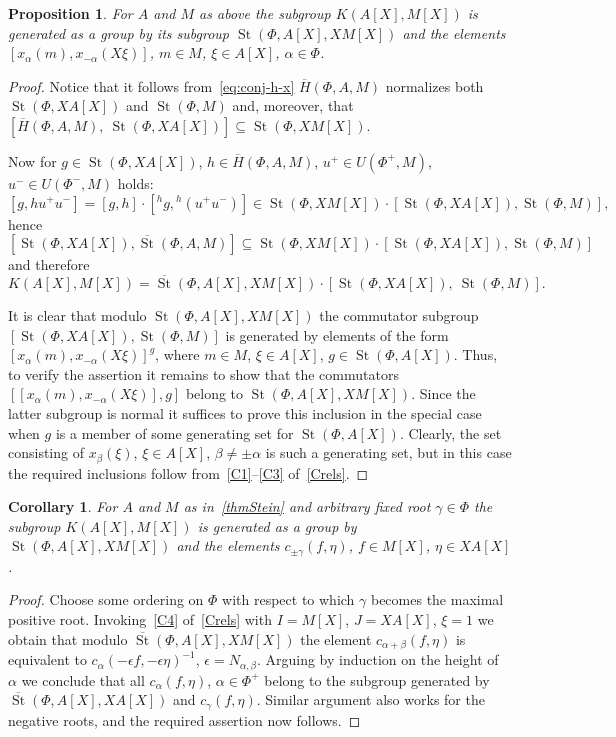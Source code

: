 \documentclass[oneside, 8pt]{amsart}
\newtheorem{prop}{Proposition}
\newtheorem{corollary}{Corollary}
\theoremstyle{remark}
\theoremstyle{definition}
\DeclareMathOperator{\St}{St}
\numberwithin{equation}{section}
\begin{document}
\begin{prop} \label{Kgen}
For $A$ and $M$ as above the subgroup $K(A[X], M[X])$ is generated as a group by its subgroup $\St(\Phi, A[X], XM[X])$ and
 the elements $[x_\alpha(m), x_{-\alpha}(X\xi)]$, $m \in M$, $\xi \in A[X]$, $\alpha \in \Phi$. \end{prop}
\begin{proof}
 Notice that it follows from~\eqref{eq:conj-h-x} $\overline{H}(\Phi, A, M)$ normalizes both $\St(\Phi, XA[X])$ and $\St(\Phi, M)$ and, moreover, that $[\overline{H}(\Phi, A, M),\ \St(\Phi, XA[X])] \subseteq \St(\Phi, XM[X])$. 
 
Now for $g \in \St(\Phi, XA[X])$, $h \in \overline{H}(\Phi, A, M)$, $u^+ \in U(\Phi^+, M)$, $u^- \in U(\Phi^-, M)$ holds:
\[ [g, h u^+ u^-] = [g, h] \cdot [{}^{h}\!g, {}^{h}\!(u^+u^-)] \in \St(\Phi, XM[X]) \cdot [\St(\Phi, XA[X]), \St(\Phi, M)],\]
hence $\left[\St(\Phi, XA[X]), \overline{\St}(\Phi, A, M)\right] \subseteq \St(\Phi, XM[X]) \cdot \left[\St(\Phi, XA[X]), \St(\Phi, M)\right]$ and therefore \[K(A[X], M[X]) = \overline{\St}(\Phi, A[X], XM[X]) \cdot \left[\St(\Phi, XA[X]),\ \St(\Phi, M)\right].\]
 
It is clear that modulo $\St(\Phi, A[X], XM[X])$ the commutator subgroup $[\St(\Phi, XA[X]), \St(\Phi, M)]$ is generated by elements of the form $[x_\alpha(m), x_{-\alpha}(X\xi)]^g$, where $m \in M$, $\xi \in A[X]$, $g \in \St(\Phi, A[X])$.
Thus, to verify the assertion it remains to show that the commutators $[[x_\alpha(m), x_{-\alpha}(X\xi)], g]$ belong to $\St(\Phi, A[X], XM[X])$.
Since the latter subgroup is normal it suffices to prove this inclusion in the special case when $g$ is a member of some generating set for $\St(\Phi, A[X])$.
Clearly, the set consisting of $x_\beta(\xi)$, $\xi \in A[X]$, $\beta \neq \pm \alpha$ is such a generating set, but in this case the required inclusions follow from~\eqref{C1}--\eqref{C3} of~\cref{Crels}. \end{proof}

\begin{corollary} \label{Kgen-strong}
 For $A$ and $M$ as in~\cref{thmStein} and arbitrary fixed root $\gamma\in \Phi$ the subgroup $K(A[X], M[X])$ is generated as a group by $\St(\Phi, A[X], XM[X])$ and the elements $c_{\pm \gamma}(f, \eta)$, $f \in M[X]$, $\eta \in XA[X]$.
\end{corollary}
\begin{proof}
 Choose some ordering on $\Phi$ with respect to which $\gamma$ becomes the maximal positive root. 
 Invoking~\eqref{C4} of~\cref{Crels} with $I = M[X]$, $J=XA[X]$, $\xi = 1$ we obtain that modulo 
 $\overline{\St}(\Phi, A[X], XM[X])$ the element $c_{\alpha + \beta}(f, \eta)$ is equivalent to 
 $c_{\alpha}(-\epsilon f, -\epsilon \eta)^{-1}$, $\epsilon = N_{\alpha, \beta}$. 
 Arguing by induction on the height of $\alpha$ we conclude that all $c_\alpha(f, \eta)$, $\alpha \in \Phi^+$
 belong to the subgroup generated by $\overline{\St}(\Phi, A[X], XA[X])$ and $c_\gamma(f, \eta)$.
 Similar argument also works for the negative roots, and the required assertion now follows.
\end{proof}
\end{document}
